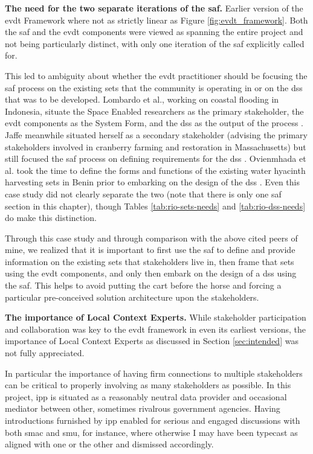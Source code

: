 \textbf{The need for the two separate iterations of the \ac{saf}.} Earlier version of the \ac{evdt} Framework where not as strictly linear as Figure \ref{fig:evdt_framework}. Both the \ac{saf} and the \ac{evdt} components were viewed as spanning the entire project and not being particularly distinct, with only one iteration of the \ac{saf} explicitly called for. 

This led to ambiguity about whether the \ac{evdt} practitioner should be focusing the \ac{saf} process on the existing \ac{sets} that the community is operating in or on the \ac{dss} that was to be developed. Lombardo et al., working on coastal flooding in Indonesia, situate the Space Enabled researchers as the primary stakeholder, the \ac{evdt} components as the System Form, and the \ac{dss} as the output of the process \cite{lombardoEnvironmentVulnerabilityDecisionTechnologyFrameworkDecision2022}.   Jaffe meanwhile situated herself as a secondary stakeholder (advising the primary stakeholders involved in cranberry farming and restoration in Massachusetts) but still focused the \ac{saf} process on defining requirements for the \ac{dss} \cite{jaffeEnvironmentalEconomicSystems2022}. Ovienmhada et al. took the time to define the forms and functions of the existing water hyacinth harvesting \ac{sets} in Benin prior to embarking on the design of the \ac{dss} \cite{ovienmhadaInclusiveDesignEarth2021}. Even this case study did not clearly separate the two (note that there is only one \ac{saf} section in this chapter), though Tables \ref{tab:rio-sets-needs} and \ref{tab:rio-dss-needs} do make this distinction. 

Through this case study and through comparison with the above cited peers of mine, we realized that it is important to first use the \ac{saf} to define and provide information on the existing \ac{sets} that stakeholders live in, then frame that \ac{sets} using the \ac{evdt} components, and only then embark on the design of a \ac{dss} using the \ac{saf}. This helps to avoid putting the cart before the horse and forcing a particular pre-conceived solution architecture upon the stakeholders. 

\textbf{The importance of Local Context Experts.} While stakeholder participation and collaboration was key to the \ac{evdt} framework in even its earliest versions, the importance of Local Context Experts as discussed in Section \ref{sec:intended} was not fully appreciated. 

In particular the importance of having firm connections to multiple stakeholders can be critical to properly involving as many stakeholders as possible. In this project, \ac{ipp} is situated as a reasonably neutral data provider and occasional mediator between other, sometimes rivalrous government agencies. Having introductions furnished by \ac{ipp} enabled for serious and engaged discussions with both \ac{smac} and \ac{smu}, for instance, where otherwise I may have been typecast as aligned with one or the other and dismissed accordingly.  

